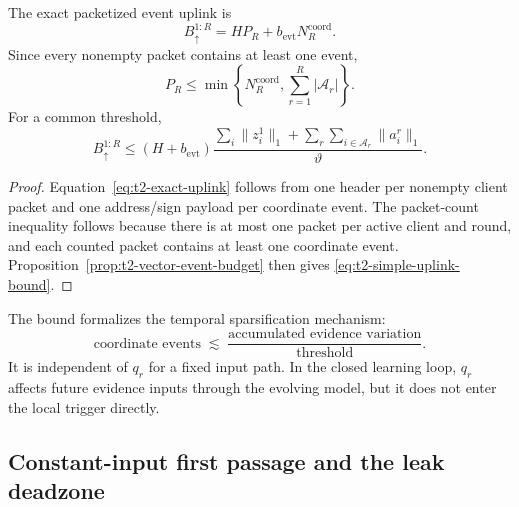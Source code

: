 \begin{corollary}
\label{cor:t2-uplink-bound}
The exact packetized event uplink is
\begin{equation}
    B_{\uparrow}^{1:R}
    =
    H P_R+b_{\mathrm{evt}}N_R^{\mathrm{coord}}.
    \label{eq:t2-exact-uplink}
\end{equation}
Since every nonempty packet contains at least one event,
\begin{equation}
    P_R
    \leq
    \min\left\{
        N_R^{\mathrm{coord}},
        \sum_{r=1}^{R}|\mathcal{A}_r|
    \right\}.
    \label{eq:t2-packet-count}
\end{equation}
For a common threshold,
\begin{equation}
    B_{\uparrow}^{1:R}
    \leq
    \left(H+b_{\mathrm{evt}}\right)
    \frac{
        \sum_i\|z_i^1\|_1+
        \sum_r\sum_{i\in\mathcal{A}_r}\|a_i^r\|_1
    }{\vartheta}.
    \label{eq:t2-simple-uplink-bound}
\end{equation}
\end{corollary}

\begin{proof}
Equation~\eqref{eq:t2-exact-uplink} follows from one header per nonempty client packet and one address/sign payload per coordinate event. The packet-count inequality follows because there is at most one packet per active client and round, and each counted packet contains at least one coordinate event. Proposition~\ref{prop:t2-vector-event-budget} then gives \eqref{eq:t2-simple-uplink-bound}.
\end{proof}

\begin{remark}
The bound formalizes the temporal sparsification mechanism:
\begin{equation}
    \text{coordinate events}
    \;\lesssim\;
    \frac{\text{accumulated evidence variation}}{\text{threshold}}.
\end{equation}
It is independent of $q_r$ for a fixed input path. In the closed learning loop, $q_r$ affects future evidence inputs through the evolving model, but it does not enter the local trigger directly.
\end{remark}

\subsection{Constant-input first passage and the leak deadzone}

